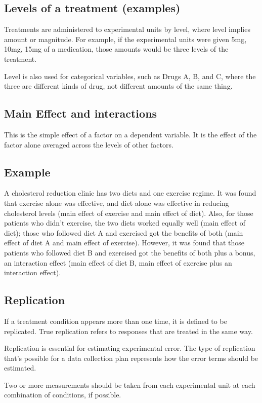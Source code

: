 \documentclass[a4paper,12pt]{article}
\begin{document}
\subsection{Levels of a treatment (examples)}
Treatments are administered to experimental units by level, where level implies amount or magnitude. For example, if the experimental units were given 5mg, 10mg, 15mg of a medication, those amounts would be three levels of the treatment. 

Level is also used for categorical variables, such as Drugs A, B, and C, where the three are different kinds of drug, not different amounts of the same thing.

\subsection{Main Effect and interactions}
This is the simple effect of a factor on a dependent variable. It is the effect of the factor alone averaged across the levels of other factors.
\subsection{Example}
A cholesterol reduction clinic has two diets and one exercise regime. It was found that exercise alone was effective, and diet alone was effective in reducing cholesterol levels (main effect of exercise and main effect of diet).  
Also, for those patients who didn't exercise, the two diets worked equally well (main effect of diet); those who followed diet A and exercised got the benefits of both (main effect of diet A and main effect of exercise). 
However, it was found that those patients who followed diet B and exercised got the benefits of both plus a bonus, an interaction effect (main effect of diet B, main effect of exercise plus an interaction effect).

\subsection{Replication}
If a treatment condition appears more than one time, it is defined to be replicated. True replication refers to responses that are treated in the same way. 

Replication is essential for estimating experimental error. The type of replication that’s possible for a data collection plan represents how the error terms should be estimated. 

Two or more measurements should be taken from each experimental unit at each combination of conditions, if possible. 
\end{document}
